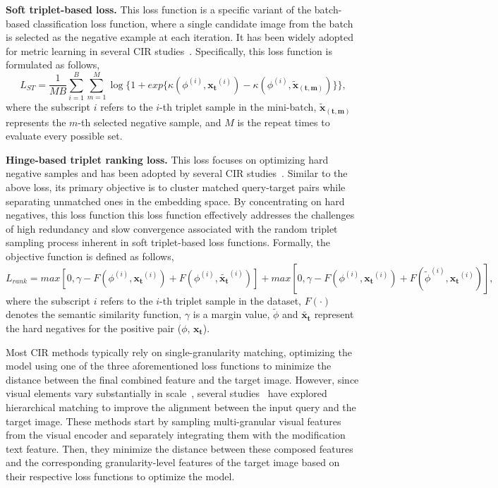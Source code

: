\textbf{Soft triplet-based loss.}
This loss function is a specific variant of the batch-based classification loss function, where a single candidate image from the batch is selected as the negative example at each iteration. It has been widely adopted for metric learning in several CIR studies~\cite{vo2019tirg, hosseinzadeh2020lbf, liu2021mgf, liu2021CIRPLANT, yang2021jpm}. Specifically, this loss function is formulated as follows,
\begin{equation}
L_{ST} = \frac{1}{MB} \sum_{i=1}^{B}  \sum_{m=1}^{M}  \log \{ 1 + exp\{ \kappa({\phi}^{(i)}, \mathbf{x_t}^{(i)}) - \kappa({\phi}^{(i)}, \mathbf{\tilde{x}_{(t,m)}})  \} \}, 
\label{eq:st_loss}
\end{equation}
where the subscript $i$ refers to the $i$-th triplet sample in the mini-batch, $ \mathbf{\tilde{x}_{(t,m)}}$ represents the $m$-th selected negative sample, and $M$ is the repeat times to evaluate every possible set. 

\textbf{Hinge-based triplet ranking loss.} This loss focuses on optimizing hard negative samples and has been adopted by several CIR studies~\cite{zhang2020jamma, zhang2021GSCMR, chen2020jvsm, li2023dscn}. Similar to the above loss, its primary objective is to cluster matched query-target pairs while separating unmatched ones in the embedding space. By concentrating on hard negatives, this loss function this loss function effectively addresses the challenges of high redundancy and slow convergence associated with the random triplet sampling process inherent in soft triplet-based loss functions. Formally, the objective function is defined as follows, 
\begin{equation}
L_{rank} = max[0, \gamma - F({\phi}^{(i)}, \mathbf{x_t}^{(i)}) + F({\phi}^{(i)}, \mathbf{\tilde{x_t}}^{(i)})] 
+ max[0, \gamma - F({\phi}^{(i)}, \mathbf{x_t}^{(i)}) +F({\tilde{\phi}}^{(i)}, \mathbf{x_t}^{(i)})], 
\label{eq:hb_loss}
\end{equation}
where the subscript $i$ refers to the $i$-th triplet sample in the dataset, $F(\cdot)$ denotes the semantic similarity function, $\gamma$ is a margin value, ${\tilde{\phi}}$ and $\tilde{\mathbf{x_t}}$ represent the hard negatives for the positive pair (${\phi}$, $\mathbf{x_t}$). 

Most CIR methods typically rely on single-granularity matching, optimizing the model using one of the three aforementioned loss functions to minimize the distance between the final combined feature and the target image. However, since visual elements vary substantially in scale~\cite{liu2021swin}, several studies~\cite{chen2020val, huang2023lgli, xu2023ComqueryFormer, li2023dscn, li2024cmap, li2023manme} have explored hierarchical matching to improve the alignment between the input query and the target image. These methods start by sampling multi-granular visual features from the visual encoder and separately integrating them with the modification text feature. Then, they minimize the distance between these composed features and the corresponding granularity-level features of the target image based on their respective loss functions to optimize the model. 


